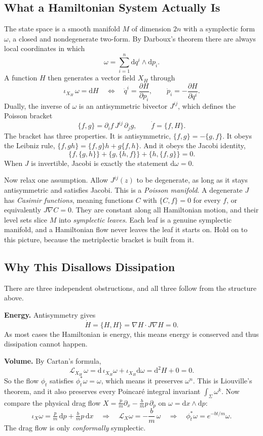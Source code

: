 \subsection{What a Hamiltonian System Actually Is}

The state space is a smooth manifold $M$ of dimension $2n$ with a symplectic form $\omega$, a closed and nondegenerate two-form. By Darboux's theorem there are always local coordinates in which
\[
	\omega = \sum_{i=1}^{n} \mathrm{d}q^i \wedge \mathrm{d}p_i .
\]
A function $H$ then generates a vector field $X_H$ through
\[
	\iota_{X_H}\,\omega = \mathrm{d}H
	\quad\Longleftrightarrow\quad
	\dot q^i = \frac{\partial H}{\partial p_i}, \qquad
	\dot p_i = -\frac{\partial H}{\partial q^i}.
\]
Dually, the inverse of $\omega$ is an antisymmetric bivector $J^{ij}$, which defines the Poisson bracket
\[
	\{f,g\} = \partial_i f \, J^{ij} \, \partial_j g,
	\qquad \dot f = \{f,H\}.
\]
The bracket has three properties. It is antisymmetric, $\{f,g\} = -\{g,f\}$. It obeys the Leibniz rule, $\{f,gh\} = \{f,g\}h + g\{f,h\}$. And it obeys the Jacobi identity,
\[
	\{f,\{g,h\}\} + \{g,\{h,f\}\} + \{h,\{f,g\}\} = 0 .
\]
When $J$ is invertible, Jacobi is exactly the statement $\mathrm{d}\omega = 0$.

Now relax one assumption. Allow $J^{ij}(z)$ to be degenerate, as long as it stays antisymmetric and satisfies Jacobi. This is a \emph{Poisson manifold}. A degenerate $J$ has \emph{Casimir functions}, meaning functions $C$ with $\{C, f\} = 0$ for every $f$, or equivalently $J\nabla C = 0$. They are constant along all Hamiltonian motion, and their level sets slice $M$ into \emph{symplectic leaves}. Each leaf is a genuine symplectic manifold, and a Hamiltonian flow never leaves the leaf it starts on. Hold on to this picture, because the metriplectic bracket is built from it.


\subsection{Why This Disallows Dissipation}

There are three independent obstructions, and all three follow from the structure above.

\textbf{Energy.} Antisymmetry gives
\[
	\dot H = \{H,H\} = \nabla H \cdot J \nabla H = 0 .
\]
As most cases the Hamiltonian is energy, this means energy is conserved and thus dissipation cannot happen.

\textbf{Volume.} By Cartan's formula,
\[
	\mathcal{L}_{X_H}\,\omega = \mathrm{d}\,\iota_{X_H}\omega + \iota_{X_H}\mathrm{d}\omega = \mathrm{d}^2 H + 0 = 0 .
\]
So the flow $\phi_t$ satisfies $\phi_t^*\omega = \omega$, which means it preserves $\omega^n$. This is Liouville's theorem, and it also preserves every Poincar\'e integral invariant $\int_\Sigma \omega^k$. Now compare the physical drag flow $X = \frac{p}{m}\partial_x - \frac{b}{m}p\,\partial_p$ on $\omega = \mathrm{d}x\wedge\mathrm{d}p$:
\[
	\iota_X \omega = \tfrac{p}{m}\,\mathrm{d}p + \tfrac{b}{m}p\,\mathrm{d}x \quad \Longrightarrow \quad \mathcal{L}_X \omega = -\frac{b}{m}\,\omega \quad \Longrightarrow \quad \phi_t^*\omega = e^{-bt/m}\omega .
\]
The drag flow is only \emph{conformally} symplectic.


